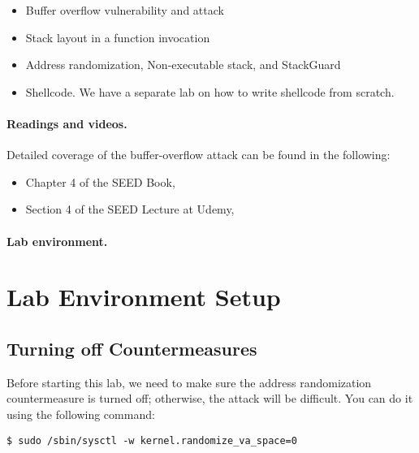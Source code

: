 \begin{itemize}[noitemsep]
\item Buffer overflow vulnerability and attack
\item Stack layout in a function invocation
\item Address randomization, Non-executable stack, and  StackGuard
\item Shellcode. We have a separate lab on how to write shellcode 
from scratch.
\end{itemize}



\paragraph{Readings and videos.}
Detailed coverage of the buffer-overflow attack can be found in the following:

\begin{itemize}
\item Chapter 4 of the SEED Book, \seedbook
\item Section 4 of the SEED Lecture at Udemy, \seedcsvideo
\end{itemize}


\paragraph{Lab environment.} \seedenvironmentC



\section{Lab Environment Setup} 


\subsection{Turning off Countermeasures} 

Before starting this lab, we need to make sure the 
address randomization countermeasure is turned off; otherwise, the 
attack will be difficult. 
You can do it using the following command:

\begin{lstlisting}
$ sudo /sbin/sysctl -w kernel.randomize_va_space=0
\end{lstlisting}
 


